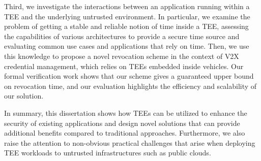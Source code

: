 Third, we investigate the interactions between an application running within a
\ac{TEE} and the underlying untrusted environment. In particular, we examine the
problem of getting a stable and reliable notion of time inside a \ac{TEE},
assessing the capabilities of various architectures to provide a secure time
source and evaluating common use cases and applications that rely on time. Then,
we use this knowledge to propose a novel revocation scheme in the context of
\ac{V2X} credential management, which relies on \acp{TEE} embedded inside
vehicles. Our formal verification work shows that our scheme gives a guaranteed
upper bound on revocation time, and our evaluation highlights the efficiency and
scalability of our solution.

In summary, this dissertation shows how \acp{TEE} can be utilized to enhance the
security of existing applications and design novel solutions that can provide
additional benefits compared to traditional approaches. Furthermore, we also
raise the attention to non-obvious practical challenges that arise when
deploying \ac{TEE} workloads to untrusted infrastructures such as public clouds.